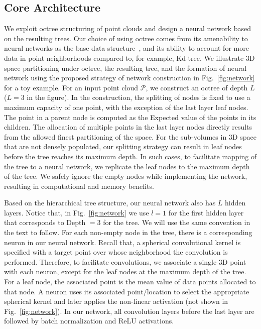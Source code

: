 \documentclass[10pt,twocolumn,letterpaper]{article}
\begin{document}
\subsection{Core Architecture}
\vspace{-2mm}
We exploit octree structuring \cite{meagher1982geometric}  of point clouds and design a  neural network  based on the resulting trees. Our choice of using octree comes from its   amenability to neural networks as the base data structure~\cite{riegler2017octnet},  and its ability to account for more data in point neighborhoods compared to, for example, Kd-tree.  We illustrate 3D space partitioning  under octree, the resulting tree, and the formation of neural network using the proposed strategy of network construction  in Fig.~\ref{fig:network} for a toy example. For an input point cloud $\mathcal{P}$, we  construct an octree of depth $L$  ($L = 3$ in the figure). In the  construction, the splitting of  nodes is fixed to use a maximum  capacity of one point, with the exception of the last layer leaf nodes. The point in a parent node is computed as the Expected value of the points in its children. The allocation of multiple points in the last layer  nodes directly results from the allowed finest partitioning of the space. For the sub-volumes in 3D space that are not densely populated, our splitting strategy can result in leaf nodes before the tree reaches its maximum depth. In such cases, to facilitate mapping of the tree  to  a neural network, we  replicate the leaf nodes to the maximum depth of the tree.
We safely ignore the empty  nodes while implementing the network,  resulting in computational and memory benefits.

Based on the hierarchical tree structure, our neural network also has $L$ hidden layers. Notice that, in Fig.~\ref{fig:network}  we use $l = 1$ for the first hidden layer that  corresponds to Depth $= 3$ for the tree. We will use the same convention in the text to follow. For each non-empty node in the tree, there is a corresponding neuron in our neural network.  Recall that, a spherical convolutional kernel is specified with a target point over whose neighborhood the convolution is performed. Therefore, to facilitate convolutions, we associate a single 3D point  with each neuron, except for the leaf nodes at the maximum depth of the tree. For a leaf node, the associated point is the mean value of data points allocated to that node.
A neuron uses its associated point/location to select the appropriate spherical kernel and later applies the non-linear activation (not shown in Fig.~\ref{fig:network}).  In our network, all  convolution layers before the last layer are followed by batch normalization 
and ReLU activations.
\end{document}
